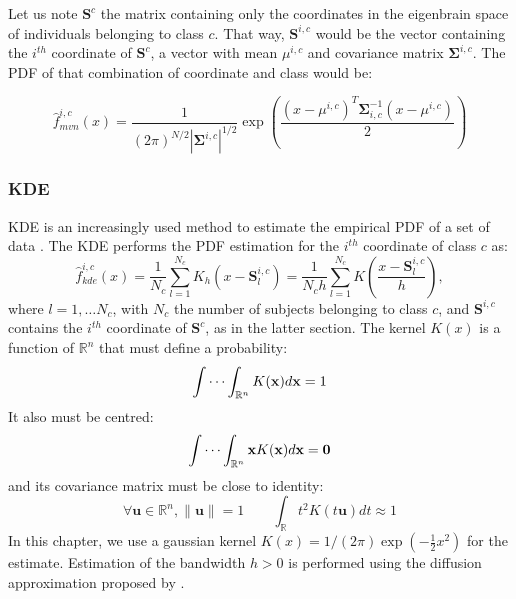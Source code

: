 Let us note $\mathbf{S}^{c}$ the matrix containing only the coordinates in the eigenbrain space of individuals belonging to class $c$. That way, $\mathbf{S}^{i,c}$ would be the vector containing the $i^{th}$ coordinate of $\mathbf{S}^{c}$, a vector with mean $\mu^{i,c}$ and covariance matrix $\boldsymbol{\Sigma}^{i,c}$. The \ac{PDF} of that combination of coordinate and class would be: 

\begin{equation}
\hat{f}_{mvn}^{i,c}(x) = \frac{1}{(2\pi)^{N/2}\left|\boldsymbol{\Sigma}^{i,c}\right|^{1/2}} \exp{ \left(\frac{(x-\mu^{i,c})^T \boldsymbol{\Sigma}_{i,c}^{-1}(x-\mu^{i,c})}{2}\right)}
\end{equation}

\subsubsection{\acf{KDE}}
\acf{KDE} is an increasingly used method to estimate the empirical \ac{PDF} of a set of data \cite{Botev2010,Simonoff2012}. The \ac{KDE} performs the \ac{PDF} estimation for the $i^{th}$ coordinate of class $c$ as: 
\begin{equation}
\hat{f}_{kde}^{i,c}(x) = \frac{1}{N_c}\sum_{l=1}^{N_c} K_h \left(x - \mathbf{S}^{i,c}_l\right) = \frac{1}{N_c h} \sum_{l=1}^{N_c} K\left(\frac{x-\mathbf{S}^{i,c}_l}{h}\right),
\end{equation}
where $l=1,\dots N_c$, with $N_c$ the number of subjects belonging to class $c$, and $\mathbf{S}^{i,c}$ contains the $i^{th}$ coordinate of $\mathbf{S}^{c}$, as in the latter section. The kernel $K(x)$ is a function of $\mathbb{R}^n$ that must define a probability: 
\begin{equation}
\idotsint_{\mathbb{R}^n} K(\mathbf{x}) d\mathbf{x} = 1
\end{equation}
It also must be centred:
\begin{equation}
\idotsint_{\mathbb{R}^n} \mathbf{x}K(\mathbf{x}) d\mathbf{x} =
\mathbf{0}
\end{equation}
and its covariance matrix must be close to identity:
\begin{equation}
\forall \mathbf{u}\in\mathbb{R}^n, \|\mathbf{u}\| = 1\qquad\int_{\mathbb{R}} t^2K(t \mathbf{u}) dt \approx	1
\end{equation}
In this chapter, we use a gaussian kernel $K(x)=1/(2\pi)\exp(-\frac{1}{2}x^2)$ for the estimate. Estimation of the bandwidth $h>0$ is performed using the diffusion approximation proposed by \cite{Botev2010}.

